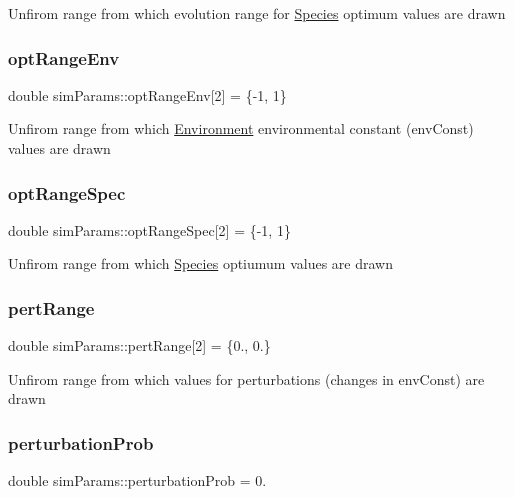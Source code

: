 Unfirom range from which evolution range for \hyperlink{classSpecies}{Species} optimum values are drawn \mbox{\label{structsimParams_ab59d469330753aebd7ce7ab893a6eda4}} 
\subsubsection{\texorpdfstring{opt\+Range\+Env}{optRangeEnv}}
{\footnotesize\ttfamily double sim\+Params\+::opt\+Range\+Env\mbox{[}2\mbox{]} = \{-\/1, 1\}}

Unfirom range from which \hyperlink{classEnvironment}{Environment} environmental constant (env\+Const) values are drawn \mbox{\label{structsimParams_a169d5e6c66da8b477bb7e384fe4c90b8}} 
\subsubsection{\texorpdfstring{opt\+Range\+Spec}{optRangeSpec}}
{\footnotesize\ttfamily double sim\+Params\+::opt\+Range\+Spec\mbox{[}2\mbox{]} = \{-\/1, 1\}}

Unfirom range from which \hyperlink{classSpecies}{Species} optiumum values are drawn \mbox{\label{structsimParams_a9b9d328e41381a83004b5fa062248fc7}} 
\subsubsection{\texorpdfstring{pert\+Range}{pertRange}}
{\footnotesize\ttfamily double sim\+Params\+::pert\+Range\mbox{[}2\mbox{]} = \{0., 0.\}}

Unfirom range from which values for perturbations (changes in env\+Const) are drawn \mbox{\label{structsimParams_aa07ddc0d55d057a586dc98ffd113e064}} 
\subsubsection{\texorpdfstring{perturbation\+Prob}{perturbationProb}}
{\footnotesize\ttfamily double sim\+Params\+::perturbation\+Prob = 0.}

